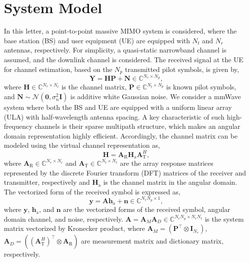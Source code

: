 \documentclass[lettersize,journal]{IEEEtran}
\begin{document}
\section{System Model}

In this letter, a point-to-point massive MIMO system is considered, where the base station (BS) and user equipment (UE) are equipped with $N_{t}$ and $N_{r}$ antennas, respectively. For simplicity, a quasi-static narrowband channel is assumed, and the downlink channel is considered. The received signal at the UE for channel estimation, based on the $N_{p}$ transmitted pilot symbols, is given by,
\begin{equation}
\mathbf{Y}=\mathbf{H}\mathbf{P}+\mathbf{N}\in \mathbb{C}^{N_{r}\times N_{p}},
\end{equation}
where $\mathbf{H}\in \mathbb{C}^{N_{r}\times N_{t}}$ is the channel matrix, $\mathbf{P}\in \mathbb{C}^{N_{t}\times N_{p}}$ is known pilot symbols, and $\mathbf{N}\sim\mathcal{N}(\mathbf{0},\sigma^{2}_{n}\mathbf{I})$ is additive white Gaussian noise. We consider a mmWave system where both the BS and UE are equipped with a uniform linear array (ULA) with half-wavelength antenna spacing. A key characteristic of such high-frequency channels is their sparse multipath structure, which makes an angular domain representation highly efficient. Accordingly, the channel matrix can be modeled using the virtual channel representation as,
\begin{equation}
\mathbf{H} = \mathbf{A}_{\text{R}}\mathbf{H}_{\text{a}}\mathbf{A}_{\text{T}}^{H},
\end{equation}
where $\mathbf{A}_{\text{R}}\in \mathbb{C}^{N_{r}\times N_{r}}$ and $\mathbf{A}_{\text{T}}\in \mathbb{C}^{N_{t}\times N_{t}}$ are the array response matrices represented by the discrete Fourier transform (DFT) matrices of the receiver and transmitter, respectively and $\mathbf{H}_{\text{a}}$ is the channel matrix in the angular domain.
The vectorized form of the received symbol is expressed as,
\begin{equation}
\mathbf{y} = \mathbf{A}\mathbf{h}_{\text{a}}+\mathbf{n}\in \mathbb{C}^{N_{r}N_{p}\times 1},
\end{equation}
where $\mathbf{y}$, $\mathbf{h}_{\text{a}}$, and $\mathbf{n}$ are the vectorized forms of the received symbol, angular domain channel, and noise, respectively. $\mathbf{A}=\mathbf{A}_{M}\mathbf{A}_{D}\in \mathbb{C}^{N_{r}N_{p}\times N_{r}N_{t}}$ is the system matrix vectorized by Kronecker product, where $\mathbf{A}_{M} = (\mathbf{P}^{\top}\otimes\mathbf{I}_{N_{r}})$, $\mathbf{A}_{D}=((\mathbf{A}_{\text{T}}^{H})^{\top}\otimes \mathbf{A}_{\text{R}})$ are measurement matrix and dictionary matrix, respectively.
\end{document}
